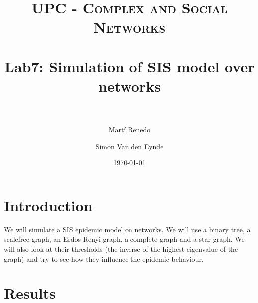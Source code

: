 \documentclass[paper=a4, fontsize=11pt]{scrartcl} %
\title{
\normalfont \normalsize
\textsc{UPC - Complex and Social Networks} \\ [25pt] %
\horrule{0.5pt} \\[0.4cm] %
\huge Lab7: Simulation of SIS model over networks \\ %
\horrule{2pt} \\[0.5cm] %
}
\author{Mart\'{i} Renedo\and Simon Van den Eynde} %
\date{\normalsize\today} %
\begin{document}
\maketitle %



\section{Introduction}

We will simulate a SIS epidemic model on networks. We will use a binary tree, a scalefree graph, an Erdos-Renyi graph, a complete graph and a star graph. We will also look at their thresholds (the inverse of the highest eigenvalue of the graph) and try to see how they influence the epidemic behaviour.


\section{Results}
\end{document}
